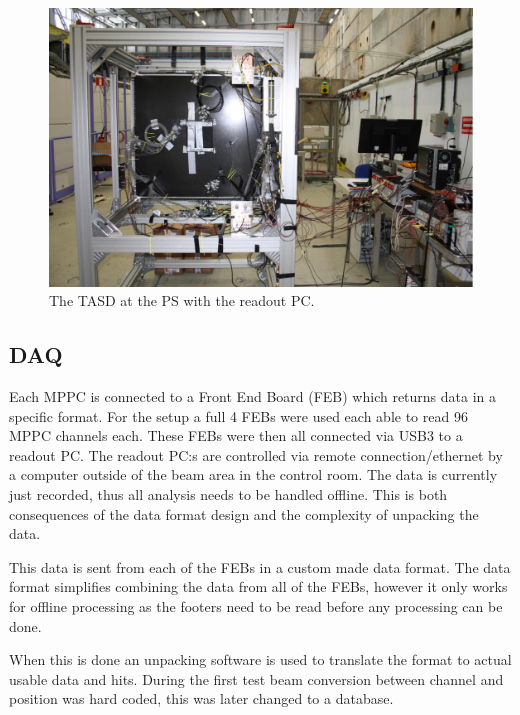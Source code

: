 \begin{figure}[h!]
\centering
\includegraphics[width=\textwidth]{figures/TASDinstrumented.jpeg}
\caption{The TASD at the PS with the readout PC.}
\label{fig:TASDreal}
\end{figure}

\subsection{DAQ}
Each MPPC is connected to a Front End Board (FEB) which returns data in a specific format. For the setup a full 4 FEBs were used each able to read 96 MPPC channels each. These FEBs were then all connected via USB3 to a readout PC. The readout PC:s are controlled via remote connection/ethernet by a computer outside of the beam area in the control room. The data is currently just recorded, thus all analysis needs to be handled offline. This is both consequences of the data format design and the complexity of unpacking the data.


This data is sent from each of the FEBs in a custom made data format. The data format simplifies combining the data from all of the FEBs, however it only works for offline processing as the footers need to be read before any processing can be done.

When this is done an unpacking software is used to translate the format to actual usable data and hits. During the first test beam conversion between channel and position was hard coded, this was later changed to a database.  

